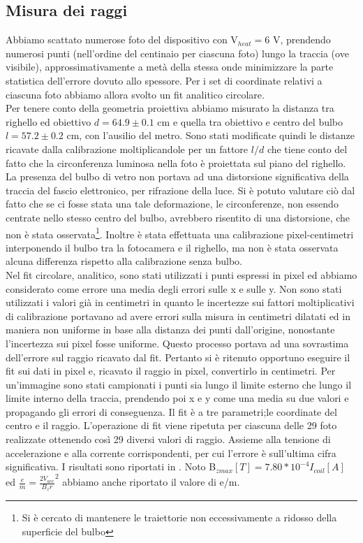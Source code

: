 \subsection{Misura dei raggi}
Abbiamo scattato numerose foto del dispositivo con V$_{heat} = 6$ V, prendendo numerosi punti (nell'ordine del centinaio per ciascuna foto) lungo la traccia (ove visibile), approssimativamente a metà della stessa onde minimizzare la parte statistica dell'errore dovuto allo spessore. Per i set di coordinate relativi a ciascuna foto abbiamo allora svolto un fit analitico circolare.\\
 Per tenere conto della geometria proiettiva abbiamo misurato la distanza tra righello ed obiettivo $d=64.9 \pm 0.1$ cm e quella tra obiettivo e centro del bulbo $l=57.2 \pm 0.2$ cm, con l'ausilio del metro. Sono stati modificate quindi le distanze ricavate dalla calibrazione moltiplicandole per un fattore $l/d$ che tiene conto del fatto che la circonferenza luminosa nella foto è proiettata sul piano del righello.\\
 La presenza del bulbo di vetro non portava ad una distorsione significativa della traccia del fascio elettronico, per rifrazione della luce. Si è potuto valutare ciò dal fatto che se ci fosse stata una tale deformazione, le circonferenze, non essendo centrate nello stesso centro del bulbo, avrebbero risentito di una distorsione, che non è stata osservata\footnote{Si è cercato di mantenere le traiettorie non eccessivamente a ridosso della superficie del bulbo}. Inoltre è stata effettuata una calibrazione pixel-centimetri interponendo il bulbo tra la fotocamera e il righello, ma non è stata osservata alcuna differenza rispetto alla calibrazione senza bulbo.\\
Nel fit circolare, analitico, sono stati utilizzati i punti espressi in pixel ed abbiamo considerato come errore una media degli errori sulle x e sulle y. Non sono stati utilizzati i valori già in centimetri in quanto le incertezze sui fattori moltiplicativi di calibrazione  portavano ad avere errori sulla misura in centimetri dilatati ed in maniera non uniforme in base alla distanza dei punti dall'origine, nonostante l'incertezza sui pixel fosse uniforme. Questo processo portava ad una sovrastima dell'errore sul raggio ricavato dal fit. Pertanto si è ritenuto opportuno eseguire il fit sui dati in pixel e, ricavato il raggio in pixel, convertirlo in centimetri.
 Per un'immagine sono stati campionati i punti sia lungo il limite esterno che lungo il limite interno della traccia, prendendo poi x e y come una media su due valori e propagando gli errori di conseguenza. Il fit è a tre parametri;le coordinate del centro e il raggio. L'operazione di fit viene ripetuta per ciascuna delle 29 foto realizzate ottenendo così 29 diversi valori di raggio. Assieme alla tensione di accelerazione e alla corrente corrispondenti, per cui l'errore è sull'ultima cifra significativa. I risultati sono riportati in . Noto B$_{zmax}[T] = 7.80*10^{-4}I_{coil}[A]$ ed $\frac{e}{m}= \frac{2V_{acc}}{{B_{z}r}}^2$ abbiamo anche riportato il valore di e/m.\\
